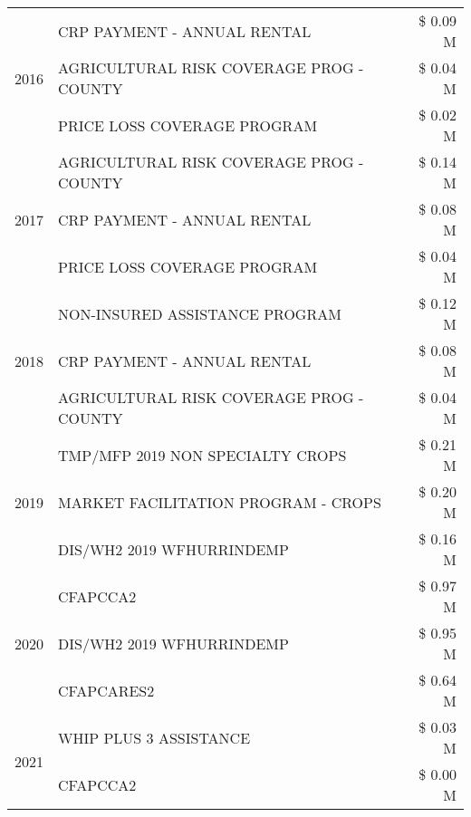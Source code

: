 \begin{tabular}{llr}
\cline{1-3}
\multirow[t]{3}{*}{2016} & CRP PAYMENT - ANNUAL RENTAL & \$ 0.09 M \\
 & AGRICULTURAL RISK COVERAGE PROG - COUNTY & \$ 0.04 M \\
 & PRICE LOSS COVERAGE PROGRAM & \$ 0.02 M \\
\cline{1-3}
\multirow[t]{3}{*}{2017} & AGRICULTURAL RISK COVERAGE PROG - COUNTY & \$ 0.14 M \\
 & CRP PAYMENT - ANNUAL RENTAL & \$ 0.08 M \\
 & PRICE LOSS COVERAGE PROGRAM & \$ 0.04 M \\
\cline{1-3}
\multirow[t]{3}{*}{2018} & NON-INSURED ASSISTANCE PROGRAM & \$ 0.12 M \\
 & CRP PAYMENT - ANNUAL RENTAL & \$ 0.08 M \\
 & AGRICULTURAL RISK COVERAGE PROG - COUNTY & \$ 0.04 M \\
\cline{1-3}
\multirow[t]{3}{*}{2019} & TMP/MFP 2019 NON SPECIALTY CROPS & \$ 0.21 M \\
 & MARKET FACILITATION PROGRAM - CROPS & \$ 0.20 M \\
 & DIS/WH2 2019 WFHURRINDEMP & \$ 0.16 M \\
\cline{1-3}
\multirow[t]{3}{*}{2020} & CFAPCCA2 & \$ 0.97 M \\
 & DIS/WH2 2019 WFHURRINDEMP & \$ 0.95 M \\
 & CFAPCARES2 & \$ 0.64 M \\
\cline{1-3}
\multirow[t]{2}{*}{2021} & WHIP PLUS 3 ASSISTANCE & \$ 0.03 M \\
 & CFAPCCA2 & \$ 0.00 M \\
\cline{1-3}
\bottomrule
\end{tabular}

